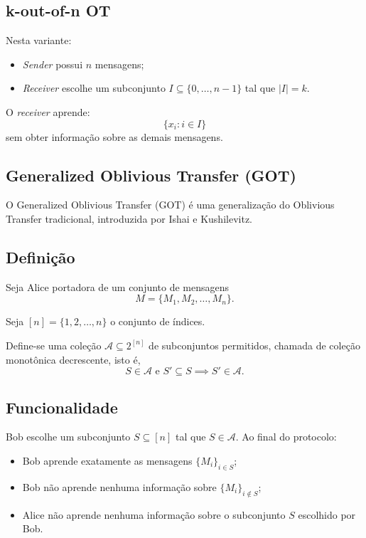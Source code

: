 \documentclass[12pt, oneside, a4paper, english, brazil]{abntex2}
\begin{document}
\subsection{k-out-of-n OT}

Nesta variante:

\begin{itemize}
\item \emph{Sender} possui $n$ mensagens;
\item \emph{Receiver} escolhe um subconjunto $I \subseteq \{0, \ldots, n-1\}$
tal que $|I| = k$.
\end{itemize}

O \emph{receiver} aprende:
\[
\{x_i : i \in I\}
\]
sem obter informação sobre as demais mensagens.

\subsection{Generalized Oblivious Transfer (GOT)}

O Generalized Oblivious Transfer (GOT) é uma generalização do Oblivious
Transfer tradicional, introduzida por Ishai e Kushilevitz.
\cite{tassa2011}

\subsection{Definição}

Seja Alice portadora de um conjunto de mensagens
\[
M = \{M_1, M_2, \ldots, M_n\}.
\]

Seja $[n] = \{1, 2, \ldots, n\}$ o conjunto de índices.

Define-se uma coleção $\mathcal{A} \subseteq 2^{[n]}$ de subconjuntos
permitidos, chamada de coleção monotônica decrescente, isto é,
\[
S \in \mathcal{A} \text{ e } S' \subseteq S \implies S' \in \mathcal{A}.
\]

\subsection{Funcionalidade}

Bob escolhe um subconjunto $S \subseteq [n]$ tal que $S \in \mathcal{A}$. Ao
final do protocolo:

\begin{itemize}
\item Bob aprende exatamente as mensagens $\{M_i\}_{i \in S}$;
\item Bob não aprende nenhuma informação sobre $\{M_i\}_{i \notin S}$;
\item Alice não aprende nenhuma informação sobre o subconjunto $S$ escolhido
por Bob.
\end{itemize}
\end{document}
